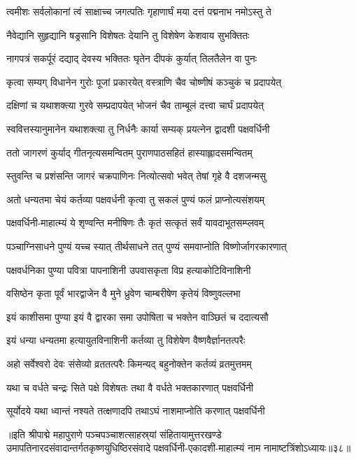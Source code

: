 \twolineshloka
{त्वमीशः सर्वलोकानां त्वं साक्षाच्च जगत्पतिः}
{गृहाणार्घं मया दत्तं पद्मनाभ नमोऽस्तु ते}%

\twolineshloka
{नैवेद्यानि सुहृद्यानि षड्रसानि विशेषतः}
{देयानि तु विशेषेण केशवाय सुभक्तितः}%

\twolineshloka
{नागपत्रं सकर्पूरं दद्याद् देवस्य भक्तितः}
{घृतेन दीपकं कुर्यात् तिलतैलेन वा पुनः}%

\twolineshloka
{कृत्वा सम्यग् विधानेन गुरोः पूजां प्रकारयेत्}
{वस्त्राणि चैव चोष्णीषं कञ्चुकं च प्रदापयेत्}%

\twolineshloka
{दक्षिणां च यथाशक्त्या गुरवे सम्प्रदापयेत् }
{भोजनं चैव ताम्बूलं दत्त्वा चार्घं प्रदापयेत्}%

\twolineshloka
{स्ववित्तस्यानुमानेन यथाशक्त्या तु निर्धनैः}
{कार्या सम्यक् प्रयत्नेन द्वादशी पक्षवर्धिनी}%

\twolineshloka
{ततो जागरणं कुर्याद् गीतनृत्यसमन्वितम्}
{पुराणपाठसहितं हास्याह्लादसमन्वितम्}%

\twolineshloka
{स्तुवन्ति च प्रशंसन्ति जागरं चक्रपाणिनः}
{नित्योत्सवो भवेत् तेषां गृहे वै दशजन्मसु}%

\twolineshloka
{अतो धन्यतमा चेयं कर्तव्या पक्षवर्धनी}
{कृत्वा तु सकलं पुण्यं फलं प्राप्नोत्यसंशयम्}%

\twolineshloka
{पक्षवर्धिनी-माहात्म्यं ये शृण्वन्ति मनीषिणः}
{तैः कृतं सत्कृतं सर्वं यावदाभूतसम्प्लवम्}%

\twolineshloka
{पञ्चाग्निसाधने पुण्यं यच्च स्यात् तीर्थसाधने}
{तत् पुण्यं समवाप्नोति विष्णोर्जागरकारणात्}%

\twolineshloka
{पक्षवर्धनिका पुण्या पवित्रा पापनाशिनी}
{उपवासकृता विप्र हत्याकोटिविनाशिनी}%

\twolineshloka
{वसिष्ठेन कृता पूर्वं भारद्वाजेन वै मुने}
{ध्रुवेण चाम्बरीषेण कृतेयं विष्णुवल्लभा}%

\twolineshloka
{इयं काशीसमा पुण्या इयं वै द्वारका समा}
{उपोषिता च भक्तेन वाञ्छितं च ददात्यसौ}%

\twolineshloka
{इयं धन्या धन्यतमा हत्यायुतविनाशिनी}
{कर्तव्या तु विशेषेण वैष्णवैर्ज्ञानतत्परैः}%

\twolineshloka
{अहो सर्वेश्वरो देवः संसेव्यो व्रततत्परैः}
{किमन्यद् बहुनोक्तेन कर्तव्यं व्रतमुत्तमम्}%

\twolineshloka
{यथा च वर्धते चन्द्रः सिते पक्षे विशेषतः}
{तथा वै वर्धते भक्तकारणात् पक्षवर्धिनी}%

\twolineshloka
{सूर्योदये यथा ध्वान्तं नश्यते तत्क्षणादपि}
{तथाऽघं नाशमाप्नोति करणात् पक्षवर्धिनी}%

॥इति श्रीपाद्मे महापुराणे पञ्चपञ्चाशत्साहस्र्यां संहितायामुत्तरखण्डे उमापतिनारदसंवादान्तर्गतकृष्णयुधिष्ठिरसंवादे पक्षवर्धिनी-एकादशी-माहात्म्यं नाम नामाष्टत्रिंशोऽध्यायः॥३८॥

\genMangalaShloka

\hyperref[sec:ekadashi_mahatmyam_padma_puranam]{\closesub}
\clearpage

